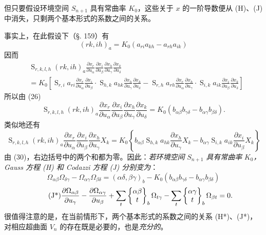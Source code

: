 但只要假设环境空间 \(S_{n+1}\) 具有常曲率 \(K_0\)，这些关于 \(x\) 的一阶导数便从 (H)、(J) 中消失，只剩两个基本形式的系数之间的关系。

事实上，在此假设下（\S. 159）有
\[
 (rk,ih)_a=K_0(a_{ri}a_{kh}-a_{rh}a_{ik})
\]
因而
\[
\begin{aligned}
&\mathop{\mathrm{S}}_{r,k,l,h}(rk,ih)_a
 \frac{\partial x_r}{\partial u_\alpha}\frac{\partial x_i}{\partial u_\beta}
 \frac{\partial x_h}{\partial u_\gamma}\frac{\partial x_k}{\partial u_\delta} \\
&=K_0\left[
 \mathop{\mathrm{S}}_{r,i}a_{ri}\frac{\partial x_r}{\partial u_\alpha}\frac{\partial x_i}{\partial u_\beta}
 \cdot\mathop{\mathrm{S}}_{h,k}a_{hk}\frac{\partial x_h}{\partial u_\gamma}\frac{\partial x_k}{\partial u_\delta}
 -\mathop{\mathrm{S}}_{r,h}a_{rh}\frac{\partial x_r}{\partial u_\alpha}\frac{\partial x_h}{\partial u_\gamma}
 \cdot\mathop{\mathrm{S}}_{i,k}a_{ik}\frac{\partial x_i}{\partial u_\beta}\frac{\partial x_k}{\partial u_\delta}
 \right]
\end{aligned}
\]
所以由 (26)
\[
 \mathop{\mathrm{S}}_{r,k,l,h}(rk,ih)_a
 \frac{\partial x_r}{\partial u_\alpha}\frac{\partial x_i}{\partial u_\beta}
 \frac{\partial x_h}{\partial u_\gamma}\frac{\partial x_k}{\partial u_\delta}
 =K_0(b_{\alpha\beta}b_{\gamma\delta}-b_{\alpha\gamma}b_{\beta\delta}).
\]
类似地还有
\[
 \mathop{\mathrm{S}}_{r,k,l,h}(rk,ih)_a
 \frac{\partial x_r}{\partial u_\alpha}\frac{\partial x_i}{\partial u_\beta}
 \frac{\partial x_h}{\partial u_\gamma}X_k
 =K_0\left\{b_{\alpha\beta}\mathop{\mathrm{S}}_{h,k}a_{hk}\frac{\partial x_h}{\partial u_\gamma}X_k
 -b_{\alpha\gamma}\mathop{\mathrm{S}}_{i,k}a_{ik}\frac{\partial x_i}{\partial u_\beta}X_k\right\}
\]
由 (30)，右边括号中的两个和都为零。因此：\emph{若环境空间} \(S_{n+1}\) \emph{具有常曲率} \(K_0\)\emph{，Gauss 方程 (H) 和 Codazzi 方程 (J) 分别变为}：
\begin{equation}\tag{H*}
 \Omega_{\alpha\beta}\Omega_{\delta\gamma}-\Omega_{\alpha\gamma}\Omega_{\beta\delta}
 =(\alpha\delta,
\beta\gamma)_b-K_0(b_{\alpha\beta}b_{\gamma\delta}-b_{\alpha\gamma}b_{\beta\delta})
\end{equation}
\begin{equation}\tag{J*}
 \frac{\partial\Omega_{\alpha\beta}}{\partial u_\gamma}
 -\frac{\partial\Omega_{\alpha\gamma}}{\partial u_\beta}
 +\sum_t\left\{\begin{matrix}\alpha\beta\\t\end{matrix}\right\}_{b}\Omega_{t\gamma}
 -\sum_t\left\{\begin{matrix}\alpha\gamma\\t\end{matrix}\right\}_{b}\Omega_{\beta t}=0.
\end{equation}
很值得注意的是，在当前情形下，两个基本形式的系数之间的关系 (H*)、(J*)，对相应超曲面 \(V_n\) 的存在既是必要的，也是\emph{充分的}。

